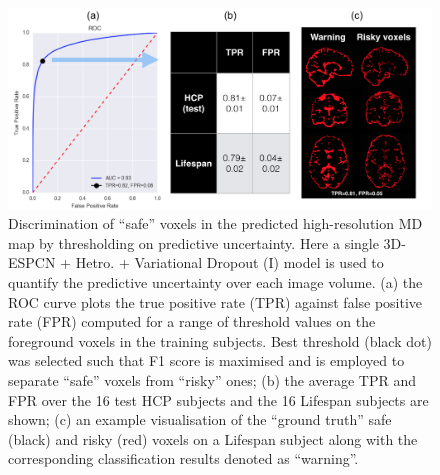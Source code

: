
\begin{figure}[t] 
	\centering
	\includegraphics[width=0.9\linewidth]{chapter_3/figures/fig_5_6.png}
	\small
	\caption{Discrimination of ``safe'' voxels in the predicted high-resolution MD map by thresholding on predictive uncertainty. Here a single 3D-ESPCN + Hetro. + Variational Dropout (I) model is used to quantify the predictive uncertainty over each image volume. (a) the ROC curve plots the true positive rate (TPR) against false positive rate (FPR) computed  for a range of threshold values on the foreground voxels in the training subjects. Best threshold (black dot) was selected such that F1 score is maximised and is employed to separate ``safe'' voxels from ``risky'' ones; (b) the average TPR and FPR over the 16 test HCP subjects and the 16 Lifespan subjects are shown; (c) an example visualisation of the ``ground truth'' safe (black) and risky (red) voxels on a Lifespan subject along with the corresponding classification results denoted as ``warning''. } 
	
	
	\label{fig:roc}
\end{figure}

